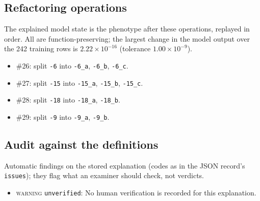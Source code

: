 \begin{drafted}
\subsection{Refactoring operations}\label{app:heart-s2-c3:operations}
The explained model state is the phenotype after these operations, replayed in order. All are function-preserving; the largest change in the model output over the 242 training rows is $2.22\times 10^{-16}$ (tolerance $1.00\times 10^{-9}$).
\begin{itemize}
\item \#26: split \texttt{-6} into \texttt{-6\_\allowbreak{}a}, \texttt{-6\_\allowbreak{}b}, \texttt{-6\_\allowbreak{}c}.
\item \#27: split \texttt{-15} into \texttt{-15\_\allowbreak{}a}, \texttt{-15\_\allowbreak{}b}, \texttt{-15\_\allowbreak{}c}.
\item \#28: split \texttt{-18} into \texttt{-18\_\allowbreak{}a}, \texttt{-18\_\allowbreak{}b}.
\item \#29: split \texttt{-9} into \texttt{-9\_\allowbreak{}a}, \texttt{-9\_\allowbreak{}b}.
\end{itemize}
\subsection{Audit against the definitions}\label{app:heart-s2-c3:audit}
Automatic findings on the stored explanation (codes as in the JSON record's \texttt{issues}); they flag what an examiner should check, not verdicts.
\begin{itemize}
\item \textsc{warning} \texttt{unverified}: No human verification is recorded for this explanation.
\end{itemize}
\end{drafted}
